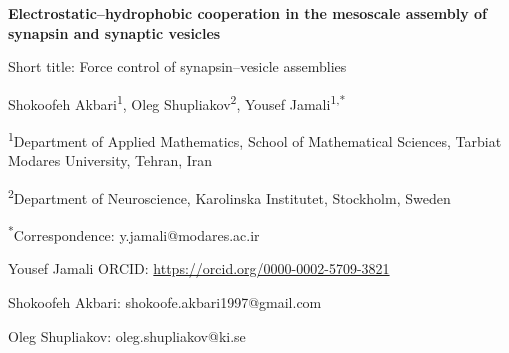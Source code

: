 \documentclass[11pt,letterpaper]{article}
\begin{document}
\begin{center}
{\LARGE\bfseries Electrostatic--hydrophobic cooperation in the mesoscale
assembly of synapsin and synaptic vesicles\par}
\vspace{0.3em}
{\normalsize Short title: Force control of synapsin--vesicle assemblies\par}
\vspace{0.6em}
{\large Shokoofeh Akbari\textsuperscript{1},
Oleg Shupliakov\textsuperscript{2},
Yousef Jamali\textsuperscript{1,*}\par}
\vspace{0.4em}
\textsuperscript{1}Department of Applied Mathematics, School of Mathematical Sciences,
Tarbiat Modares University, Tehran, Iran\par
\textsuperscript{2}Department of Neuroscience, Karolinska Institutet,
Stockholm, Sweden\par
\textsuperscript{*}Correspondence: y.jamali@modares.ac.ir\par
Yousef Jamali ORCID: \url{https://orcid.org/0000-0002-5709-3821}\par
Shokoofeh Akbari: shokoofe.akbari1997@gmail.com\par
Oleg Shupliakov: oleg.shupliakov@ki.se
\end{center}
\clearpage
\doublespacing
\linenumbers

\begin{abstract}
Synapsin associates with synaptic vesicles, but local association does
not always connect vesicle groups. We used a three-dimensional Brownian
agent model to compare electrostatic and hydrophobic interactions in a
four-condition design at fixed abundance and confinement. Electrostatics
rapidly placed synapsin near almost every vesicle, while larger networks
developed more slowly. With both interactions active, a large connected
assembly formed earlier and synapsin motion was slower. Following all
conditions for 84 ms showed continued growth under either interaction
alone. Their vesicle participation became similar despite different
levels of protein association. The positive early interaction contrast
decreased as these assemblies grew, and the later contrast depended on
which structural measure was used. Contact composition and network
connectivity therefore resolve different stages of synapsin-mediated
organization, from local vesicle coverage to collective assembly.
\end{abstract}
\end{document}
